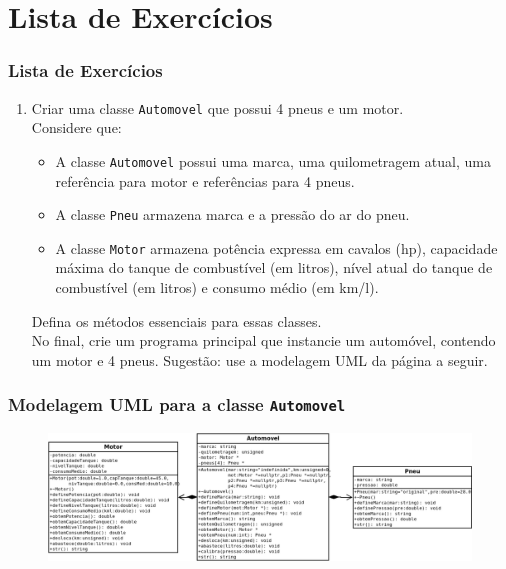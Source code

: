\documentclass[aspectratio=169]{beamer}
\newcommand\setItemnumber[1]{\setcounter{enumi}{\numexpr#1-1\relax}}
\begin{document}
\section{Lista de Exercícios}

\begin{frame}\frametitle{Lista de Exercícios}
\begin{enumerate}
	\setItemnumber{1}
	\item Criar uma classe \texttt{Automovel} que possui 4 pneus e um motor.
	\\Considere que:
	\begin{itemize}
		\item A classe \texttt{Automovel} possui uma marca, uma quilometragem atual, uma referência para motor e referências para 4 pneus.
		\item A classe \texttt{Pneu} armazena marca e a pressão do ar do pneu.
		\item A classe \texttt{Motor} armazena potência expressa em cavalos (hp), capacidade máxima do tanque de combustível (em litros), nível atual do tanque de combustível (em litros) e consumo médio (em km/l).
	\end{itemize}
	Defina os métodos essenciais para essas classes.\\
	No final, crie um programa principal que instancie um automóvel, contendo um motor e 4 pneus. Sugestão: use a modelagem UML da página a seguir.
\end{enumerate}
\end{frame}

\begin{frame}\frametitle{Modelagem UML para a classe \texttt{Automovel}}
\begin{figure}[h]
	\centering
	\includegraphics[height=0.45\paperheight]{imagens/modelagem_automovel.png}
\end{figure}
\end{frame}
\end{document}
